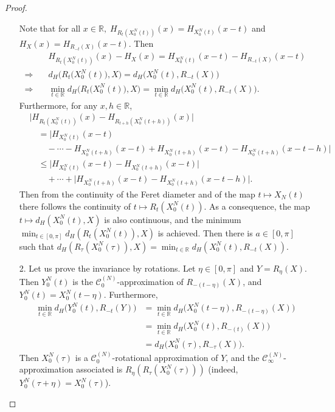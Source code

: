 \documentclass[numbers,compress,v1.0.1]{vmsta}
\theoremstyle{definition}
\begin{document}
\begin{proof}
\begin{enumerate}
Note that for all $x\in\mathbb{R},\; H_ {R_t(X_0^{N}(t))}(x)=H_
{X_0^{N}(t)}(x-t)$ and $H_X(x)=H_{R_{-t}(X)}(x-t)$. Then
%
\begin{align*}
&H_ {R_t(X_0^{N}(t))}(x)-H_X(x)= H_
{X_0^{N}(t)}(x-t)-H_{R_{-t}(X)}(x-t)
\\
\Rightarrow\quad &  d_H\bigl(R_t\bigl(X_0^{N}(t)
\bigr),X\bigr)=d_H\bigl(X_0^{N}(t),R_{-t}(X)
\bigr)
\\
\Rightarrow\quad & \min_{t\in\mathbb{R}}d_H\bigl(R_t
\bigl(X_0^{N}(t)\bigr),X\bigr)=\min_{t\in
\mathbb{R}}d_H
\bigl(X_0^{N}(t),R_{-t}(X)\bigr).
\end{align*}
%
Furthermore, for any $x,h\in\mathbb{R}$,
%
\begin{align*}
&\bigl\vert H_ {R_t(X_0^{N}(t))}(x)- H_ {R_{t+h}(X_0^{N}(t+h))}(x)\bigr\vert \\
&\quad =\bigl\vert H_ {X_0^{N}(t)}(x-t)\\
&\qquad-\cdots-H_ {X_0^{N}(t+h)}(x-t)+ H_ {X_0^{N}(t+h)}(x-t)-H_{X_0^{N}(t+h)}(x-t-h)\bigr\vert\\
&\quad \leq\bigl\vert H_ {X_0^{N}(t)}(x-t)- H_ {X_0^{N}(t+h)}(x-t)\bigr\vert\\
&\qquad+\cdots+\bigl\vert H_ {X_0^{N}(t+h)}(x-t)- H_ {X_0^{N}(t+h)}(x-t-h)\bigr\vert.
\end{align*}
%
Then from the continuity of the Feret diameter and of the map $t\mapsto
X_N(t)$ there follows the continuity of $t\mapsto R_t(X_0^{N}(t))$. As
a consequence, the map $t\mapsto d_H(X_0^{N}(t),X)$ is also continuous,
and the minimum $\min_{t\in[0,\pi]}d_H(R_t(X_0^{N}(t)),X) $ is
achieved. Then there is $a\in[0,\pi]$ such that $d_H(R_\tau
(X_0^{N}(\tau)),X)=\min_{t\in\mathbb{R}}d_H(X_0^{N}(t),R_{-t}(X))$.
%
\item[2.] Let us prove the invariance by rotations. Let $\eta\in[0,\pi
]$ and $Y=R_\eta(X)$. Then $Y_0^{N}(t)$ is the $\mathcal
{C}_{0}^{(N)}$-approximation of $R_{-(t-\eta)}(X)$, and
$Y_0^{N}(t)=X_0^{N}(t-\eta)$. Furthermore,
%
\begin{align*}
\min_{t\in\mathbb{R}}d_H\bigl(Y_0^{N}(t),R_{-t}(Y)
\bigr)&=\min_{t\in\mathbb
{R}}d_H\bigl(X_0^{N}(t-
\eta),R_{-(t-\eta)}(X)\bigr)
\\
&=\min_{t\in\mathbb{R}}d_H\bigl(X_0^{N}(t),R_{-(t)}(X)
\bigr)
\\
&=d_H\bigl(X_0^{N}(\tau),R_{-\tau}(X)
\bigr).
\end{align*}
%
Then $X_0^{N}(\tau)$ is a $\mathcal{C}^{(N)}_0$-rotational
approximation of $Y$, and the $\mathcal{C}^{(N)}_\infty$-approximation
associated is $ R_{\eta}(R_\tau(X_0^{N}(\tau)))$ (indeed, $Y_0^{N}(\tau
+\eta)=X_0^{N}(\tau)$).\qedhere
\end{enumerate}
\end{proof}
\end{document}
